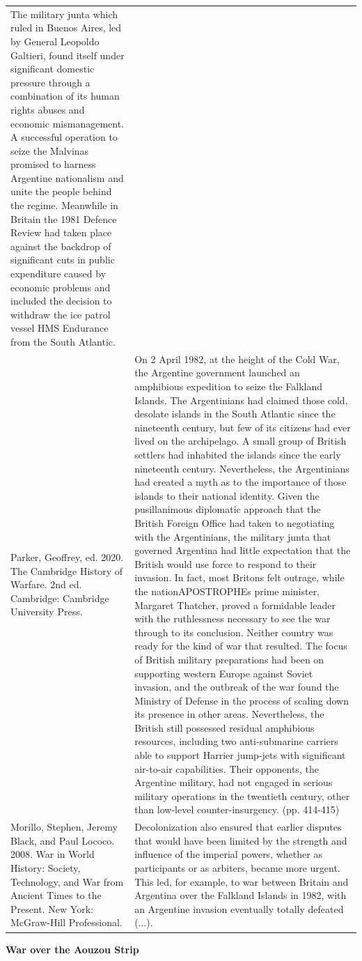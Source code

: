 {\begin{longtable}{p{}p{}}
The military junta which ruled in Buenos Aires, led by General Leopoldo Galtieri, found itself under significant domestic pressure through a combination of its human rights abuses and economic mismanagement. A successful operation to seize the Malvinas promised to harness Argentine nationalism and unite the people behind the regime. Meanwhile in Britain the 1981 Defence Review had taken place against the backdrop of significant cuts in public expenditure caused by economic problems and included the decision to withdraw the ice patrol vessel HMS Endurance from the South Atlantic.
\\
Parker, Geoffrey, ed. 2020. The Cambridge History of Warfare. 2nd ed. Cambridge: Cambridge University Press. & On 2 April 1982, at the height of the Cold War, the Argentine government launched an amphibious expedition to seize the Falkland Islands. The Argentinians had claimed those cold, desolate islands in the South Atlantic since the nineteenth century, but few of its citizens had ever lived on the archipelago. A small group of British settlers had inhabited the islands since the early nineteenth century. Nevertheless, the Argentinians had created a myth as to the importance of those islands to their national identity. Given the pusillanimous diplomatic approach that the British Foreign Office had taken to negotiating with the Argentinians, the military junta that governed Argentina had little expectation that the British would use force to respond to their invasion. In fact, most Britons felt outrage, while the nationAPOSTROPHEs prime minister, Margaret Thatcher, proved a formidable leader with the ruthlessness necessary to see the war through to its conclusion. Neither country was ready for the kind of war that resulted. The focus of British military preparations had been on supporting western Europe against Soviet invasion, and the outbreak of the war found the Ministry of Defense in the process of scaling down its presence in other areas. Nevertheless, the British still possessed residual amphibious resources, including two anti-submarine carriers able to support Harrier jump-jets with significant air-to-air capabilities. Their opponents, the Argentine military, had not engaged in serious military operations in the twentieth century, other than low-level counter-insurgency. (pp. 414-415)
\\
Morillo, Stephen, Jeremy Black, and Paul Lococo. 2008. War in World History: Society, Technology, and War from Ancient Times to the Present. New York: McGraw-Hill Professional. & Decolonization also ensured that earlier disputes that would have been limited by the strength and influence of the imperial powers, whether as participants or as arbiters, became more urgent. This led, for example, to war between Britain and Argentina over the Falkland Islands in 1982, with an Argentine invasion eventually totally defeated (...).
\\
\end{longtable}}
\clearpage
         \textbf{War over the Aouzou Strip} 

